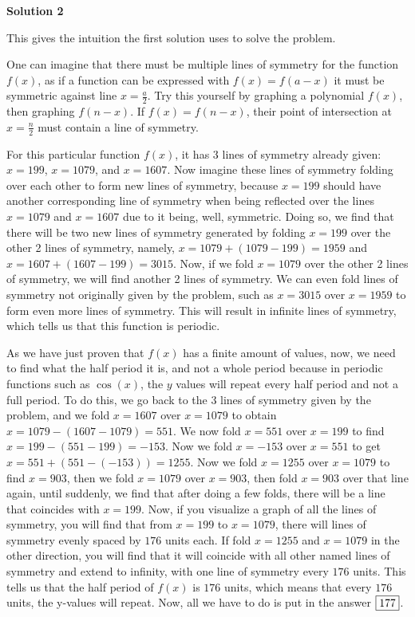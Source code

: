 \begin{enumerate}
\textbf{Solution 2}

This gives the intuition the first solution uses to solve the problem.

 One can imagine that there must be multiple lines of symmetry for the function $f(x)$, as if a function can be expressed with $f(x)=f(a-x)$ it must be symmetric against line $x=\frac{a}{2}$. Try this yourself by graphing a polynomial $f(x)$, then graphing $f(n-x)$. If $f(x)=f(n-x)$, their point of intersection at $x=\frac{n}{2}$ must contain a line of symmetry.

 For this particular function $f(x)$, it has $3$ lines of symmetry already given: $x=199$, $x=1079$, and $x=1607$. Now imagine these lines of symmetry folding over each other to form new lines of symmetry, because $x=199$ should have another corresponding line of symmetry when being reflected over the lines $x=1079$ and $x=1607$ due to it being, well, symmetric. Doing so, we find that there will be two new lines of symmetry generated by folding $x=199$ over the other 2 lines of symmetry, namely, $x=1079+(1079-199)=1959$ and $x=1607+(1607-199)=3015$. Now, if we fold $x=1079$ over the other 2 lines of symmetry, we will find another 2 lines of symmetry. We can even fold lines of symmetry not originally given by the problem, such as $x=3015$ over $x=1959$ to form even more lines of symmetry. This will result in infinite lines of symmetry, which tells us that this function is periodic.

 As we have just proven that $f(x)$ has a finite amount of values, now, we need to find what the half period it is, and not a whole period because in periodic functions such as $\cos(x)$, the $y$ values will repeat every half period and not a full period. To do this, we go back to the 3 lines of symmetry given by the problem, and we fold $x=1607$ over $x=1079$ to obtain $x=1079-(1607-1079)=551$. We now fold $x=551$ over $x=199$ to find $x=199-(551-199)=-153$. Now we fold $x=-153$ over $x=551$ to get $x=551+(551-(-153))=1255$. Now we fold $x=1255$ over $x=1079$ to find $x=903$, then we fold $x=1079$ over $x=903$, then fold $x=903$ over that line again, until suddenly, we find that after doing a few folds, there will be a line that coincides with $x=199$. Now, if you visualize a graph of all the lines of symmetry, you will find that from $x=199$ to $x=1079$, there will lines of symmetry evenly spaced by $176$ units each. If fold $x=1255$ and $x=1079$ in the other direction, you will find that it will coincide with all other named lines of symmetry and extend to infinity, with one line of symmetry every $176$ units. This tells us that the half period of $f(x)$ is $176$ units, which means that every $176$ units, the y-values will repeat. Now, all we have to do is put in the answer $\fbox{177}$.


\end{enumerate}
